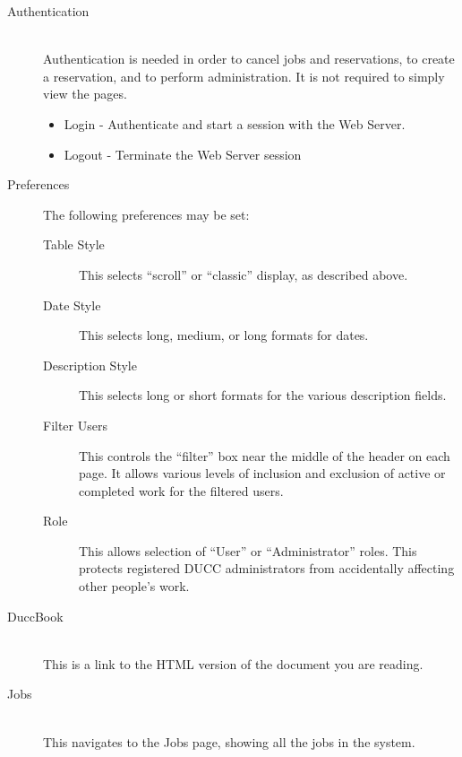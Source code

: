         \begin{description}
          \item[Authentication] \hfill \\ 
            Authentication is needed in order to cancel jobs and reservations, to create a
            reservation, and to perform administration. It is not required to simply view the pages.

            \begin{itemize}
              \item Login - Authenticate and start a session with the Web Server.             
              \item Logout - Terminate the Web Server session 
            \end{itemize}

          \item[Preferences]
            The following preferences may be set:
            \begin{description}
              \item[Table Style] This selects ``scroll'' or ``classic'' display, as
                described above.
              \item[Date Style] This selects long, medium, or long formats for dates.
              \item[Description Style] This selects long or short formats for the various
                description fields.
              \item[Filter Users] This controls the ``filter'' box near the middle of
                the header on each page.  It allows various levels of inclusion and
                exclusion of active or completed work for the filtered users.
              \item[Role] This allows selection of ``User'' or ``Administrator'' roles.
                This protects registered DUCC administrators from accidentally affecting
                other people's work.
            \end{description}
            
          \item[DuccBook] \hfill \\
            This is a link to the HTML version of the document you are reading.

          \item[Jobs] \hfill \\
            This navigates to the Jobs page, showing all the jobs in the system.


\end{description}
